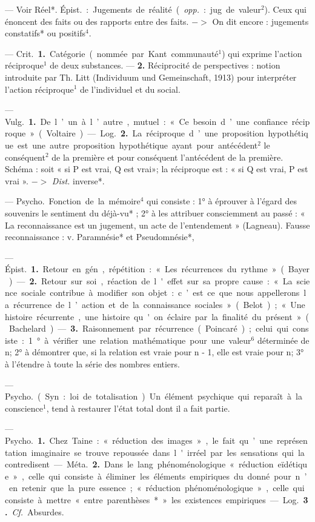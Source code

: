 \begin{itemize}[leftmargin=1cm, label=, itemsep=1pt]
 — Voir Réel*. \si{Épist.} : Jugements de réalité ({\it opp.} : jug. de valeur$^2$). Ceux qui énoncent des faits
ou des rapports entre des faits.
$->$ On dit encore : jugements constatifs* ou positifs$^4$.

 — \si{Crit.} {\bf 1.} Catégorie
(nommée par Kant communauté$^1$)
qui exprime l’action réciproque$^1$ de
deux substances. — {\bf 2.} Réciprocité de
perspectives : notion introduite par
Th. Litt (Individuum und Gemeinschaft, 1913) pour interpréter l’action
réciproque$^1$ de l'individuel et du
social.

 — \si{Vulg.} {\bf 1.} De l’un à
l’autre, mutuel : « Ce besoin d’une
confiance réciproque » (Voltaire). —
\si{Log.} {\bf 2.} La réciproque d’une proposition hypothétique est une autre
proposition hypothétique ayant pour
antécédent$^2$ le conséquent$^2$ de la
première et pour conséquent l’antécédent
de la première. Schéma : soit
« si P est vrai, Q est vrai»; la réciproque est : « si Q est vrai, P est
vrai ». $->$ {\it Dist.} inverse*.

 — \si{Psycho.} Fonction
de la mémoire$^4$ qui consiste : 1° à
éprouver à l’égard des souvenirs le
sentiment du déjà-vu* ; 2° à les
attribuer consciemment au passé :
« La reconnaissance est un jugement, un acte de l’entendement »
(Lagneau). Fausse reconnaissance :
v. Paramnésie* et Pseudomnésie*,

 — \si{Épist.} {\bf 1.} Retour en
gén., répétition : « Les récurrences
du rythme » (Bayer). — {\bf 2.} Retour
sur soi, réaction de l'effet sur sa
propre cause : « La science sociale
contribue à modifier son objet : c’est
ce que nous appellerons la récurrence de l’action et de la connaissance sociales » (Belot) ; « Une histoire récurrente, une histoire qu'on
éclaire par la finalité du présent »
(Bachelard). — {\bf 3.} Raisonnement par
récurrence (Poincaré) ; celui qui consiste : 1° à vérifier une relation mathématique pour une valeur$^6$ déterminée de n; 2° à démontrer que, si
la relation est vraie pour n - 1,
elle est vraie pour n; 3° à l’étendre
à toute la série des nombres entiers.

 — \si{Psycho.}
(Syn. : loi de totalisation). Un élément psychique qui reparaît à la
conscience$^1$, tend à restaurer l’état
total dont il a fait partie.

 — \si{Psycho.} {\bf 1.} Chez Taine :
« réduction des images », le fait
qu’une représentation imaginaire se
trouve repoussée dans l'irréel par
les sensations qui la contredisent. —
\si{Méta.} {\bf 2.} Dans le lang. phénoménologique « réduction eïdétique »,
celle qui consiste à éliminer les éléments
empiriques du donné pour
n’en retenir que la pure essence;
« réduction phénoménologique »,
celle qui consiste à mettre « entre
parenthèses* » les existences empiriques. — \si{Log.} {\bf 3.} {\it Cf.} Absurdes.


\end{itemize}
